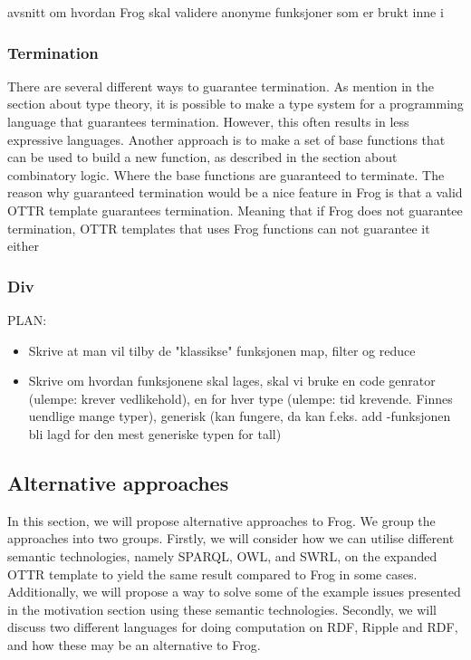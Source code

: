 \para
avsnitt om hvordan Frog skal validere anonyme funksjoner som er brukt inne i 


\subsubsection{Termination}
There are several different ways to guarantee termination. As mention in the section about type theory, 
it is possible to make a type system for a programming language that guarantees termination. However, this often results in less expressive languages. 
Another approach is to make a set of base functions that can be used to build a new function, as described in the section about combinatory logic. 
Where the base functions are guaranteed to terminate. The reason why guaranteed termination would be a nice feature in Frog is that a valid OTTR template guarantees termination. 
Meaning that if Frog does not guarantee termination, OTTR templates that uses Frog functions can not guarantee it either
   

\subsubsection{Div}
PLAN:
\begin{itemize}
    \item Skrive at man vil tilby de "klassikse" funksjonen map, filter og reduce
    \item Skrive om hvordan funksjonene skal lages, skal vi bruke en code genrator (ulempe: krever vedlikehold), en for hver type (ulempe: tid krevende. Finnes uendlige mange typer), generisk (kan fungere, da kan f.eks. add -funksjonen bli lagd for den mest generiske typen for tall)
\end{itemize}


\subsection{Alternative approaches}
In this section, we will propose alternative approaches to Frog.  We group the approaches into two groups.  Firstly, we will consider how we can utilise different semantic technologies, namely SPARQL, OWL, and SWRL,  on the expanded OTTR template to yield the same result compared to Frog in some cases. Additionally, we will propose a way to solve some of the example issues presented in the motivation section using these semantic technologies.  Secondly, we will discuss two different languages for doing computation on RDF, Ripple and RDF, and how these may be an alternative to Frog. 

